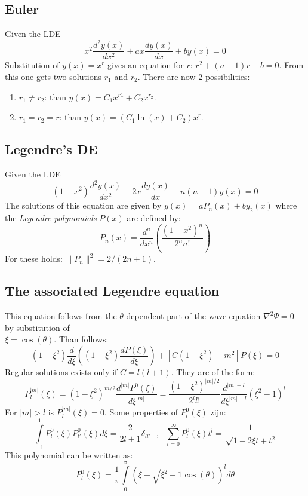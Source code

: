 \documentclass[twoside]{report}
\begin{document}
\subsection{Euler}
Given the LDE
\[
x^2\frac{d^2y(x)}{dx^2}+ax\frac{dy(x)}{dx}+by(x)=0
\]
Substitution of $y(x)=x^r$ gives an equation for $r$: $r^2+(a-1)r+b=0$. From
this one gets two solutions $r_1$ and $r_2$. There are now 2 possibilities:
\begin{enumerate}
\item $r_1\neq r_2$: than $y(x)=C_1x^{r1}+C_2x^{r_2}$.
\item $r_1=r_2=r$: than $y(x)=(C_1\ln(x)+C_2)x^r$.
\end{enumerate}

\subsection{Legendre's DE}
Given the LDE
\[
(1-x^2)\frac{d^2y(x)}{dx^2}-2x\frac{dy(x)}{dx}+n(n-1)y(x)=0
\]
The solutions of this equation are given by $y(x)=aP_n(x)+by_2(x)$
where the {\it Legendre polynomials} $P(x)$ are defined by:
\[
P_n(x)=\frac{d^n}{dx^n}\left(\frac{(1-x^2)^n}{2^n n!}\right)
\]
For these holds: $\|P_n\|^2=2/(2n+1)$.

\subsection{The associated Legendre equation}
This equation follows from the $\theta$-dependent part of the wave equation
$\nabla^2\Psi=0$ by substitution of\\ $\xi=\cos(\theta)$. Than follows:
\[
(1-\xi^2)\frac{d}{d\xi}\left((1-\xi^2)\frac{dP(\xi)}{d\xi}\right)+
[C(1-\xi^2)-m^2]P(\xi)=0
\]
Regular solutions exists only if $C=l(l+1)$. They are of the form:
\[
P_l^{|m|}(\xi)=(1-\xi^2)^{m/2}\frac{d^{|m|}P^0(\xi)}{d\xi^{|m|}}=
\frac{(1-\xi^2)^{|m|/2}}{2^ll!}\frac{d^{|m|+l}}{d\xi^{|m|+l}}(\xi^2-1)^l
\]
For $|m|>l$ is $P_l^{|m|}(\xi)=0$.
Some properties of $P_l^0(\xi)$ zijn:
\[
\int\limits_{-1}^1P_l^0(\xi)P_{l'}^0(\xi)d\xi=\frac{2}{2l+1}\delta_{ll'}~~~,~~~
\sum_{l=0}^\infty P_l^0(\xi)t^l=\frac{1}{\sqrt{1-2\xi t+t^2}}
\]
This polynomial can be written as:
\[
P_l^0(\xi)=\frac{1}{\pi}\int\limits_0^\pi(\xi+\sqrt{\xi^2-1}\cos(\theta))^ld\theta
\]
\end{document}
